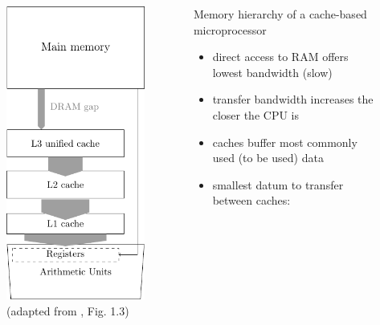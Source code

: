 \documentclass[9pt,xcolor=table]{beamer}
\begin{document}
\begin{frame}
\begin{columns}[c]
  \begin{column}{.45\textwidth}
    \begin{figure}[htb]
      \includegraphics[height=0.85\textheight]{tikz/dram_gap}\\[6pt]\small
      (adapted from \cite{HagerWelleinIntroHPC}, Fig. 1.3)
    \end{figure}
  \end{column}
  \begin{column}{.45\textwidth}
    \vfill
    \begin{block}{Memory hierarchy of a cache-based microprocessor}
      \begin{itemize}
      \item direct access to RAM offers lowest bandwidth (slow)
      \item transfer bandwidth increases the closer the CPU is
      \item caches buffer most commonly used (to be used) data
      \item smallest datum to transfer between caches:

\end{itemize}
\end{block}
\end{column}
\end{columns}
\end{frame}
\end{document}
